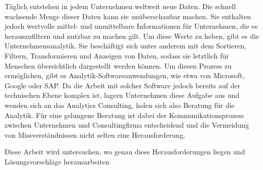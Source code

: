\documentclass[../main.tex]{subfiles}
\begin{document}
Täglich entstehen in jedem Unternehmen weltweit neue Daten.
Die schnell wachsende Menge dieser Daten kann sie unüberschaubar machen. Sie enthalten jedoch wertvolle mittel- und unmittelbare Informationen für Unternehmen, die es herauszufiltern und nutzbar zu machen gilt.
Um diese Werte zu heben, gibt es die Unternehmensanalytik. Sie beschäftigt sich unter anderem mit dem
Sortieren, Filtern, Transformieren und Anzeigen von Daten, sodass sie letztlich für Menschen übersichtlich dargestellt werden können. Um diesen Prozess zu ermöglichen, gibt es Analytik-Softwareanwendungen, wie etwa von Microsoft, Google oder SAP.
Da die Arbeit mit solcher Software jedoch bereits auf der technischen Ebene komplex ist, lagern Unternehmen diese Aufgabe aus und wenden sich an das Analytics Consulting, holen sich also Beratung für die Analytik. Für eine gelungene Beratung ist dabei der Kommunikationsprozess zwischen Unternehmen und Consultingfirma entscheidend und die Vermeidung von Missverständnissen nicht selten eine Herausforderung.
 
Diese Arbeit wird untersuchen, wo genau diese Herausforderungen liegen und Lösungsvorschläge herausarbeiten
\end{document}
